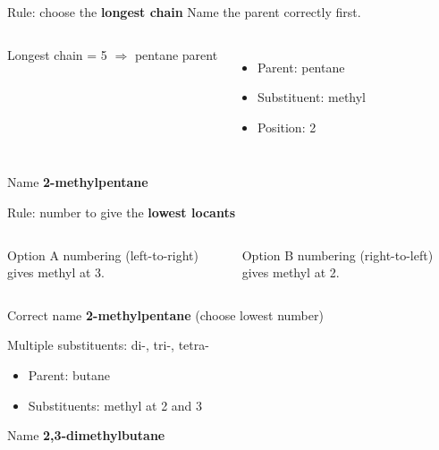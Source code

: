 \documentclass[aspectratio=169]{beamer}
\begin{document}
\begin{frame}{Rule: choose the \textbf{longest chain}}
Name the parent correctly first.

\begin{columns}[T,onlytextwidth]
\centering
{}

\vspace{1mm}
Longest chain = 5 \(\Rightarrow\) pentane parent

\begin{itemize}
\item Parent: pentane
\item Substituent: methyl
\item Position: 2
\end{itemize}
\end{columns}

\begin{block}{Name}
\textbf{2-methylpentane}
\end{block}
\end{frame}

\begin{frame}{Rule: number to give the \textbf{lowest locants}}
\begin{columns}[T,onlytextwidth]
\centering
{}

Option A numbering (left-to-right) gives methyl at 3.

\centering
{}

Option B numbering (right-to-left) gives methyl at 2.
\end{columns}

\begin{block}{Correct name}
\textbf{2-methylpentane} (choose lowest number)
\end{block}
\end{frame}

\begin{frame}{Multiple substituents: di-, tri-, tetra-}
\centering
{}

\vspace{2mm}
\begin{itemize}
\item Parent: butane
\item Substituents: methyl at 2 and 3
\end{itemize}

\begin{block}{Name}
\textbf{2,3-dimethylbutane}
\end{block}
\end{frame}
\end{document}
